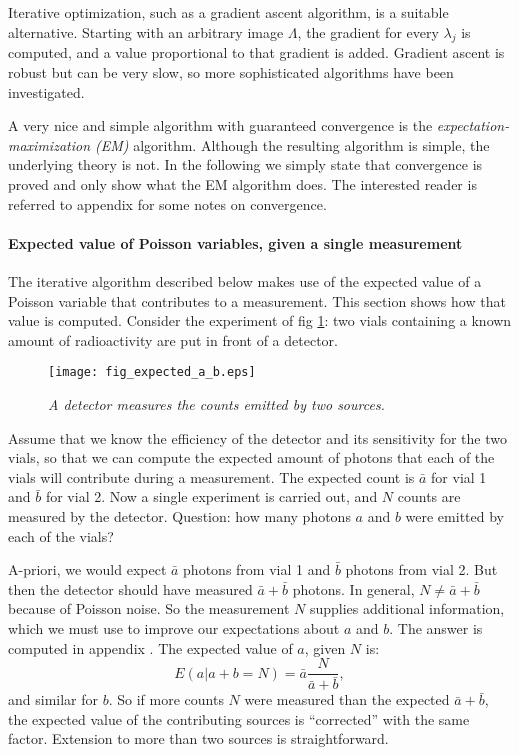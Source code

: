 Iterative optimization, such as a gradient ascent algorithm, is a suitable
alternative.  Starting with an arbitrary image $\Lambda$, the gradient for
every $\lambda_j$ is computed, and a value proportional to that gradient is
added.  Gradient ascent is robust but can be very slow, so more sophisticated
algorithms have been investigated.

A very nice and simple algorithm with guaranteed convergence is the {\em
expectation- maximization (EM)} algorithm.  Although the resulting algorithm
is simple, the underlying theory is not. In the following we simply state that
convergence is proved and only show what the EM algorithm does. The interested
reader is referred to appendix  for some notes on convergence.

\paragraph{Expected value of Poisson variables, given a single measurement
 \label{sec:expect_a_b}\\}
The iterative algorithm described below makes use of the expected value of a
Poisson variable that contributes to a measurement. This section shows how
that value is computed. Consider the experiment of
fig \ref{fig:expected_a_b}: two vials containing a known amount of
radioactivity are put in front of a detector.
%
\begin{figure}[tb]
\centering
\texttt{[image: fig\_expected\_a\_b.eps]}
\caption{\label{fig:expected_a_b} \emph{A detector measures the counts emitted
by two sources.}}
\end{figure}
%
Assume that we know the efficiency of the detector and its sensitivity for the
two vials, so that we can compute the expected amount of photons that each of
the vials will contribute during a measurement. The expected count is
$\bar{a}$ for vial 1 and $\bar{b}$ for vial 2. Now a single experiment is
carried out, and $N$ counts are measured by the detector.  Question: how many
photons $a$ and $b$ were emitted by each of the vials?

A-priori, we would expect $\bar{a}$ photons from vial 1 and $\bar{b}$ photons
from vial 2. But then the detector should have measured $\bar{a} + \bar{b}$
photons. In general, $N \neq \bar{a} + \bar{b}$ because of Poisson noise. So
the measurement $N$ supplies additional information, which we must use to
improve our expectations about $a$ and $b$. The answer is computed in appendix
. The expected value of $a$, given $N$ is:
\begin{equation}
  E(a | a + b = N) = \bar{a} \frac{N}{\bar{a} + \bar{b}}, \label{eq:expect_a_b}
\end{equation}
and similar for $b$. So if more counts $N$ were measured than the expected
$\bar{a}+\bar{b}$, the expected value of the contributing sources is
``corrected'' with the same factor. Extension to more than two sources is
straightforward.

